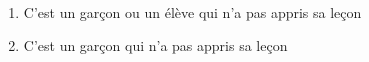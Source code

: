 ~\\
 \begin{enumerate}
 \item \og C'est un garçon ou un élève qui n'a pas appris sa leçon \fg
 \item \og C'est un garçon qui n'a pas appris sa leçon \fg
 \end{enumerate}
